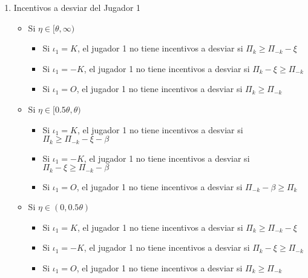 {\begin{enumerate}
\begin{enumerate}
\begin{enumerate}
\begin{itemize}
            La mejor respuesta del jugador 2 si recibe un señal $E_{-k}$ es:
            \begin{equation*}
                \gamma_2(E_{-k})=
                \begin{cases}
                    I \text{ si } \eta \geq \theta \\
                    NI \text{ si } \eta < \theta \\
                \end{cases}    
            \end{equation*}
        \end{itemize}
    \end{enumerate}
    \item Incentivos a desviar del Jugador 1
    \begin{itemize}
        \item Si $\eta \in [\theta,\infty) $
            \begin{itemize}
                \item Si $ \iota_1=K  $, el jugador 1 no tiene incentivos a desviar si $ \Pi_k \geq \Pi_{-k} - \xi $
                \item Si $ \iota_1=-K $, el jugador 1 no tiene incentivos a desviar si $ \Pi_k - \xi \geq \Pi_{-k} $
                \item Si $ \iota_1=O  $, el jugador 1 no tiene incentivos a desviar si $ \Pi_k \geq \Pi_{-k} $
            \end{itemize}
        \item Si $\eta \in [0.5\theta, \theta) $
            \begin{itemize}
                \item Si $ \iota_1=K  $, el jugador 1 no tiene incentivos a desviar si $ \Pi_k \geq \Pi_{-k} - \xi - \beta $
                \item Si $ \iota_1=-K $, el jugador 1 no tiene incentivos a desviar si $ \Pi_k - \xi \geq \Pi_{-k} - \beta $
                \item Si $ \iota_1=O  $, el jugador 1 no tiene incentivos a desviar si $ \Pi_{-k} - \beta \geq \Pi_{k} $
            \end{itemize}
        \item Si $\eta \in (0, 0.5\theta) $
            \begin{itemize}
                \item Si $ \iota_1=K  $, el jugador 1 no tiene incentivos a desviar si $ \Pi_k \geq \Pi_{-k} - \xi $
                \item Si $ \iota_1=-K $, el jugador 1 no tiene incentivos a desviar si $ \Pi_k - \xi \geq \Pi_{-k} $
                \item Si $ \iota_1=O  $, el jugador 1 no tiene incentivos a desviar si $ \Pi_k \geq \Pi_{-k} $
            \end{itemize}
    \end{itemize}
    

\end{enumerate}
\end{enumerate}}
